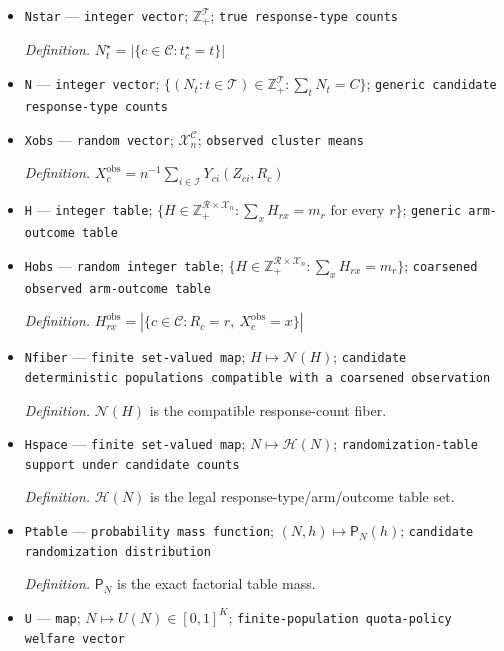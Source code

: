 \documentclass{article}
\begin{document}
\begin{itemize}
  \item \texttt{Nstar} --- \texttt{integer vector}; \(\mathbb Z_+^{\mathcal T}\); \texttt{true response-\allowbreak{}type counts}
  \par\smallskip\noindent\emph{Definition.} \(N_t^\star=|\{c\in\mathcal C:t_c^\star=t\}|\)
  \item \texttt{N} --- \texttt{integer vector}; \(\{(N_t:t\in\mathcal T)\in\mathbb Z_+^{\mathcal T}:\sum_tN_t=C\}\); \texttt{generic candidate response-\allowbreak{}type counts}
  \item \texttt{Xobs} --- \texttt{random vector}; \(\mathcal X_n^{\mathcal C}\); \texttt{observed cluster means}
  \par\smallskip\noindent\emph{Definition.} \(X_c^{\mathrm{obs}}=n^{-1}\sum_{i\in\mathcal I}Y_{ci}(Z_{ci},R_c)\)
  \item \texttt{H} --- \texttt{integer table}; \(\{H\in\mathbb Z_+^{\mathcal R\times\mathcal X_n}:\sum_xH_{rx}=m_r\text{ for every }r\}\); \texttt{generic arm-\allowbreak{}outcome table}
  \item \texttt{Hobs} --- \texttt{random integer table}; \(\{H\in\mathbb Z_+^{\mathcal R\times\mathcal X_n}:\sum_xH_{rx}=m_r\}\); \texttt{coarsened observed arm-\allowbreak{}outcome table}
  \par\smallskip\noindent\emph{Definition.} \(H_{rx}^{\mathrm{obs}}=|\{c\in\mathcal C:R_c=r,\ X_c^{\mathrm{obs}}=x\}|\)
  \item \texttt{Nfiber} --- \texttt{finite set-\allowbreak{}valued map}; \(H\mapsto\mathcal N(H)\); \texttt{candidate deterministic populations compatible with a coarsened observation}
  \par\smallskip\noindent\emph{Definition.} \(\mathcal N(H)\) is the compatible response-count fiber.
  \item \texttt{Hspace} --- \texttt{finite set-\allowbreak{}valued map}; \(N\mapsto\mathcal H(N)\); \texttt{randomization-\allowbreak{}table support under candidate counts}
  \par\smallskip\noindent\emph{Definition.} \(\mathcal H(N)\) is the legal response-type/arm/outcome table set.
  \item \texttt{Ptable} --- \texttt{probability mass function}; \((N,h)\mapsto\mathsf P_N(h)\); \texttt{candidate randomization distribution}
  \par\smallskip\noindent\emph{Definition.} \(\mathsf P_N\) is the exact factorial table mass.
  \item \texttt{U} --- \texttt{map}; \(N\mapsto U(N)\in[0,1]^K\); \texttt{finite-\allowbreak{}population quota-\allowbreak{}policy welfare vector}

\end{itemize}
\end{document}

